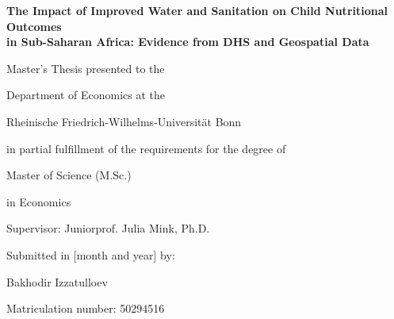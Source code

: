 \begin{titlepage}
\centering
\vspace*{2cm}

{\fontsize{14}{19.5}\bfseries\selectfont
The Impact of Improved Water and Sanitation on Child Nutritional Outcomes\\
in Sub-Saharan Africa: Evidence from DHS and Geospatial Data\par}

\vspace{2cm}
Master's Thesis presented to the\par
\vspace{0.3cm}
Department of Economics at the\par
\vspace{0.3cm}
Rheinische Friedrich-Wilhelms-Universit\"at Bonn\par
\vspace{0.3cm}
in partial fulfillment of the requirements for the degree of\par
\vspace{0.3cm}
Master of Science (M.Sc.)\par
in Economics\par

\vspace{2cm}
Supervisor: Juniorprof. Julia Mink, Ph.D.\par

\vspace{2cm}
Submitted in [month and year] by:\par
\vspace{0.2cm}
Bakhodir Izzatulloev\par
Matriculation number: 50294516\par

\vfill
\end{titlepage}
